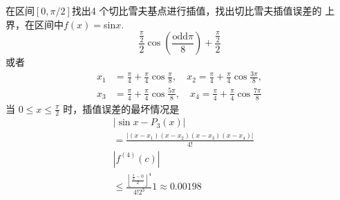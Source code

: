 \documentclass[UTF8,5pt,a4paper]{ctexart} %
\begin{document}
\begin{multicols}{4}
 在区间$[0,\pi/2]$找出4 个切比雪夫基点进行插值，找出切比雪夫插值误差的
上界，在区间中$f(x)=$sin$x.$
$$
\frac{\frac{\pi}{2}}{2} \cos\left(\frac{\text{odd}\pi}{8}\right) + \frac{\frac{\pi}{2}}{2}
$$
或者
$$\begin{aligned}
    x_{1} & = \frac{\pi}{4} + \frac{\pi}{4}\cos\frac{\pi}{8}, \quad x_{2} = \frac{\pi}{4} + \frac{\pi}{4}\cos\frac{3\pi}{8}, \\
    x_{3} & = \frac{\pi}{4} + \frac{\pi}{4}\cos\frac{5\pi}{8}, \quad x_{4} = \frac{\pi}{4} + \frac{\pi}{4}\cos\frac{7\pi}{8}
    \end{aligned}$$
当 \( 0 \leqslant x \leqslant \frac{\pi}{2} \) 时，插值误差的最坏情况是
$$\begin{aligned}
&\left| \sin x - P_{3}(x) \right| \\
&= \frac{\left| (x - x_{1})(x - x_{2})(x - x_{3})(x - x_{4}) \right|}{4!} \\
&\left| f^{(4)}(c) \right| \\
&\leqslant \frac{\left\lfloor \frac{\frac{\pi}{2} - 0}{2} \right\rfloor^{4}}{4!2^{3}}1 \approx 0.00198
\end{aligned}
$$















































































\end{multicols}
\end{document}
